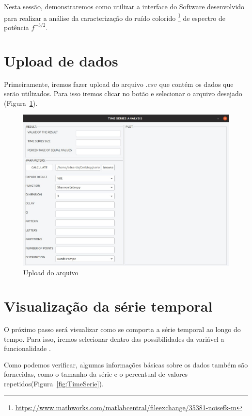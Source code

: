 
Nesta sessão, demonstraremos como utilizar a interface do Software desenvolvido para realizar a análise da caracterização do ruído colorido \footnote{\url{https://www.mathworks.com/matlabcentral/fileexchange/35381-noisefk-m}} de espectro de potência $f^{-3/2}$.

\section{Upload de dados} 

Primeiramente, iremos fazer upload do arquivo $.csv$ que contém os dados que serão utilizados. Para isso iremos clicar no botão  e selecionar o arquivo desejado (Figura~\ref{fig:Upload}).

\begin{figure}[H]
	\centering
	\includegraphics[width=0.85\columnwidth]{capitulos/imagens/Upload} 
    \caption{Upload do arquivo}
    \label{fig:Upload}
\end{figure}

\section{Visualização da série temporal}

O próximo passo será visualizar como se comporta a série temporal ao longo do tempo. Para isso, iremos selecionar dentro das possibilidades da variável  a funcionalidade .

Como podemos verificar, algumas informações básicas sobre os dados também são fornecidas, como o tamanho da série e o percentual de valores repetidos(Figura~\ref{fig:TimeSerie}).


